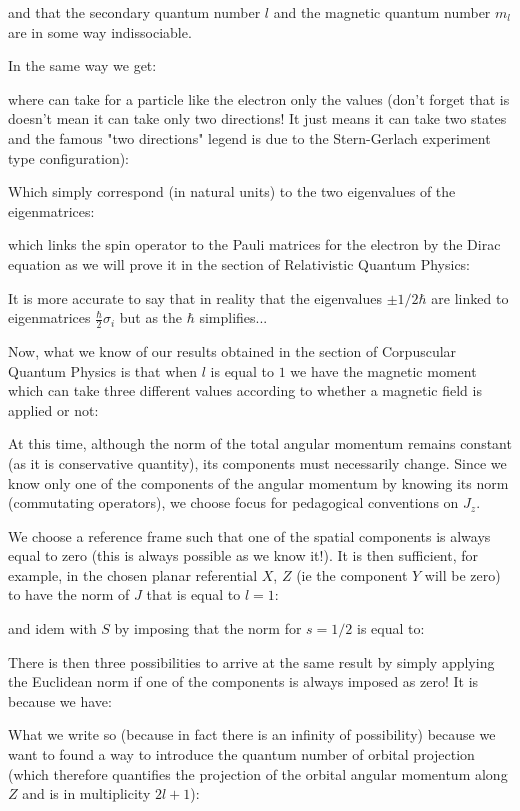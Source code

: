 	and that the secondary quantum number $l$ and the magnetic quantum number $m_l$ are in some way indissociable.

	In the same way we get:
	
	where can take for a particle like the electron only the values (don't forget that is doesn't mean it can take only two directions! It just means it can take two states and the famous "two directions" legend is due to the Stern-Gerlach experiment type configuration):
	
	Which simply correspond (in natural units) to the two eigenvalues of the eigenmatrices:
	
	which links the spin operator to the Pauli matrices for the electron  by the Dirac equation as we will prove it in the section of Relativistic Quantum Physics:
	
	\begin{tcolorbox}[title=Remark,colframe=black,arc=10pt]
	It is more accurate to say that in reality that the eigenvalues $\pm 1/2\hbar$ are linked to eigenmatrices $\frac{\hbar}{2}\sigma_i$ but as the $\hbar$ simplifies...
	\end{tcolorbox}
	Now, what we know of our results obtained in the section of Corpuscular Quantum Physics is that when $l$ is equal to $1$ we have the magnetic moment which can take three different values according to whether a magnetic field is applied or not:
	
	At this time, although the norm of the total angular momentum remains constant (as it is conservative quantity), its components must necessarily change. Since we know only one of the components of the angular momentum by knowing its norm (commutating operators), we choose focus for pedagogical conventions on $J_z$.
	
	We choose a reference frame such that one of the spatial components is always equal to zero (this is always possible as we know it!). It is then sufficient, for example, in the chosen planar referential $X$, $Z$ (ie the component $Y$ will be zero) to have the norm of $J$ that is equal to $l=1$:
	
	and idem with $S$ by imposing that the norm for $s = 1/2$ is equal to:
	
	There is then three possibilities to arrive at the same result by simply applying the Euclidean norm if one of the components is always imposed as zero! It is because we have:
	
	What we write so (because in fact there is an infinity of possibility) because we want to found a way to introduce the quantum number of orbital projection (which therefore quantifies the projection of the orbital angular momentum along $Z$ and is in multiplicity $2l + 1$):
	
